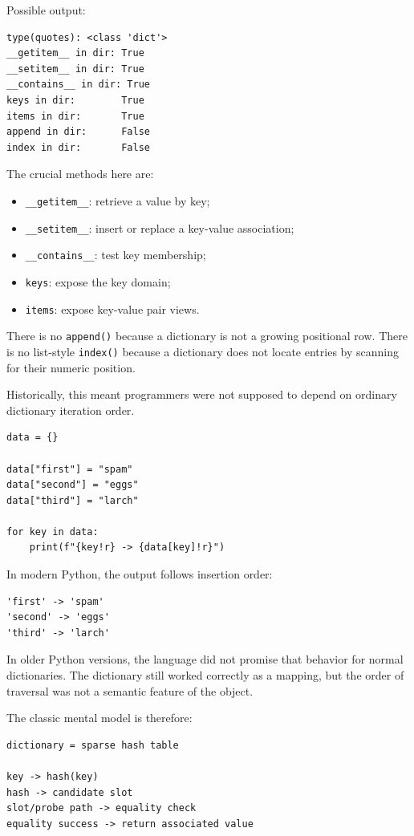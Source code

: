 Possible output:

\begin{verbatim}
type(quotes): <class 'dict'>
__getitem__ in dir: True
__setitem__ in dir: True
__contains__ in dir: True
keys in dir:        True
items in dir:       True
append in dir:      False
index in dir:       False
\end{verbatim}

The crucial methods here are:

\begin{itemize}
    \item \texttt{\_\_getitem\_\_}: retrieve a value by key;
    \item \texttt{\_\_setitem\_\_}: insert or replace a key-value association;
    \item \texttt{\_\_contains\_\_}: test key membership;
    \item \texttt{keys}: expose the key domain;
    \item \texttt{items}: expose key-value pair views.
\end{itemize}

There is no \texttt{append()} because a dictionary is not a growing positional row. There is no list-style \texttt{index()} because a dictionary does not locate entries by scanning for their numeric position.

Historically, this meant programmers were not supposed to depend on ordinary dictionary iteration order.

\begin{verbatim}
data = {}

data["first"] = "spam"
data["second"] = "eggs"
data["third"] = "larch"

for key in data:
    print(f"{key!r} -> {data[key]!r}")
\end{verbatim}

In modern Python, the output follows insertion order:

\begin{verbatim}
'first' -> 'spam'
'second' -> 'eggs'
'third' -> 'larch'
\end{verbatim}

In older Python versions, the language did not promise that behavior for normal dictionaries. The dictionary still worked correctly as a mapping, but the order of traversal was not a semantic feature of the object.

The classic mental model is therefore:

\begin{verbatim}
dictionary = sparse hash table

key -> hash(key)
hash -> candidate slot
slot/probe path -> equality check
equality success -> return associated value
\end{verbatim}

